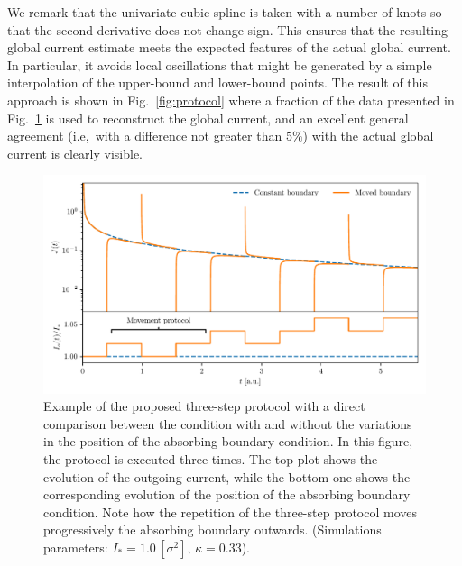 We remark that the univariate cubic spline is taken with a number of knots so that the second derivative does not change sign. This ensures that the resulting global current estimate meets the expected features of the actual global current. In particular, it avoids local oscillations that might be generated by a simple interpolation of the upper-bound and lower-bound points. The result of this approach is shown in Fig.~\ref{fig:protocol} where a fraction of the data presented in Fig.~\ref{fig:9} is used to reconstruct the global current, and an excellent general agreement (i.e,\ with a difference not greater than $5\%$) with the actual global current is clearly visible.
%
\begin{figure}[htp]
    \centering
    \includegraphics[width=\textwidth]{4_probing_the_diffusive_behavior/figs/final/the_protocol.pdf}
    \caption{Example of the proposed three-step protocol with a direct comparison between the condition with and without the variations in the position of the absorbing boundary condition. In this figure, the protocol is executed three times. The top plot shows the evolution of the outgoing current, while the bottom one shows the corresponding evolution of the position of the absorbing boundary condition. Note how the repetition of the three-step protocol moves progressively the absorbing boundary outwards. (Simulations parameters: $I_\ast = 1.0\,[\sigma^2],\,\kappa = 0.33$).}
    \label{fig:9}
\end{figure}
%
